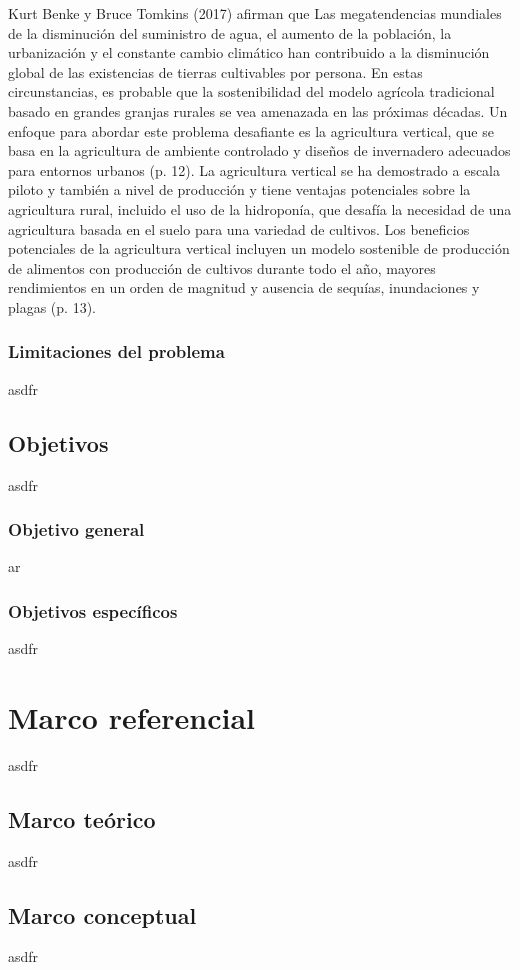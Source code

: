 \documentclass{report}
\begin{document}
\begin{enumerate}
  Kurt Benke y Bruce Tomkins (2017) afirman que Las megatendencias mundiales de
  la disminución del suministro de agua, el aumento de la población, la
  urbanización y el constante cambio climático han contribuido a la disminución
  global de las existencias de tierras cultivables por persona. En estas
  circunstancias, es probable que la sostenibilidad del modelo agrícola
  tradicional basado en grandes granjas rurales se vea amenazada en las próximas
  décadas. Un enfoque para abordar este problema desafiante es la agricultura
  vertical, que se basa en la agricultura de ambiente controlado y diseños de
  invernadero adecuados para entornos urbanos (p. 12). La agricultura vertical
  se ha demostrado a escala piloto y también a nivel de producción y tiene
  ventajas potenciales sobre la agricultura rural, incluido el uso de la
  hidroponía, que desafía la necesidad de una agricultura basada en el suelo
  para una variedad de cultivos. Los beneficios potenciales de la agricultura
  vertical incluyen un modelo sostenible de producción de alimentos con
  producción de cultivos durante todo el año, mayores rendimientos en un orden
  de magnitud y ausencia de sequías, inundaciones y plagas (p. 13).
\end{enumerate}
\subsection{Limitaciones del problema}
asdfr
\section{Objetivos}
asdfr
\subsection{Objetivo general}
ar
\subsection{Objetivos específicos}
asdfr
\chapter{Marco referencial}
asdfr
\section{Marco teórico}
asdfr
\section{Marco conceptual}
asdfr
\end{document}

